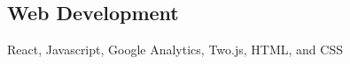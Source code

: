 \documentclass[../Resume.tex]{subfiles}
\begin{document}
    \subsection{Web Development}
    React, Javascript, Google Analytics, Two.js, HTML, and CSS
    \vspace*{-4mm}
\end{document}
